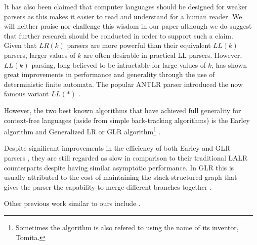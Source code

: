 \documentclass[envcountsame,runningheads]{llncs}
\begin{document}
It has also been claimed that computer languages should be designed for weaker parsers as this makes it easier to read and understand for a human reader.
We will neither praise nor challenge this wisdom in our paper although we do suggest that further research should be conducted in order to support such a claim.\\ %

Given that $LR(k)$ parsers are more powerful than their equivalent $LL(k)$ parsers, larger values of $k$ are often desirable in practical LL parsers.
However, $LL(k)$ parsing, long believed to be intractable for large values of $k$, has shown great improvements in performance and generality through the use of deterministic finite automata. %
The popular ANTLR parser introduced the now famous variant $LL(*)$ \cite{193241}. %

However, the two best known algorithms that have achieved full generality for context-free languages (aside from simple back-tracking algorithms) is the Earley algorithm \cite{362035} and Generalized LR or GLR algorithm\footnote{Sometimes the algorithm is also refered to using the name of its inventor, Tomita.} \cite{980564, 1623625}.

Despite significant improvements in the efficiency of both Earley and GLR parsers \cite{1146810, Mcpeak04elkhound:a}, they are still regarded as slow in comparison to their traditional LALR counterparts despite having similar asymptotic performance.
In GLR this is usually attributed to the cost of maintaining the stack-structured graph that gives the parser the capability to merge different branches together \cite{Mcpeak04elkhound:a}.

Other previous work similar to ours include \cite{991520, Marc80, 1287949, 146993, DBLP:conf/wia/GalvezSF06}. %
\end{document}
